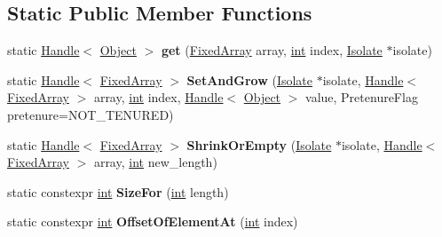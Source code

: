 \subsection*{Static Public Member Functions}
\begin{DoxyCompactItemize}
\item 
\mbox{\label{classv8_1_1internal_1_1FixedArray_a27192a0f72c7e134bbc173d14f9780d0}} 
static \mbox{\hyperlink{classv8_1_1internal_1_1Handle}{Handle}}$<$ \mbox{\hyperlink{classv8_1_1internal_1_1Object}{Object}} $>$ {\bfseries get} (\mbox{\hyperlink{classv8_1_1internal_1_1FixedArray}{Fixed\+Array}} array, \mbox{\hyperlink{classint}{int}} index, \mbox{\hyperlink{classv8_1_1internal_1_1Isolate}{Isolate}} $\ast$isolate)
\item 
\mbox{\label{classv8_1_1internal_1_1FixedArray_a43874f8238723bf8cd4a1ef8a71425fb}} 
static \mbox{\hyperlink{classv8_1_1internal_1_1Handle}{Handle}}$<$ \mbox{\hyperlink{classv8_1_1internal_1_1FixedArray}{Fixed\+Array}} $>$ {\bfseries Set\+And\+Grow} (\mbox{\hyperlink{classv8_1_1internal_1_1Isolate}{Isolate}} $\ast$isolate, \mbox{\hyperlink{classv8_1_1internal_1_1Handle}{Handle}}$<$ \mbox{\hyperlink{classv8_1_1internal_1_1FixedArray}{Fixed\+Array}} $>$ array, \mbox{\hyperlink{classint}{int}} index, \mbox{\hyperlink{classv8_1_1internal_1_1Handle}{Handle}}$<$ \mbox{\hyperlink{classv8_1_1internal_1_1Object}{Object}} $>$ value, Pretenure\+Flag pretenure=N\+O\+T\+\_\+\+T\+E\+N\+U\+R\+ED)
\item 
\mbox{\label{classv8_1_1internal_1_1FixedArray_a7bb28a3dc6e19a72d6f971d8ffadcc52}} 
static \mbox{\hyperlink{classv8_1_1internal_1_1Handle}{Handle}}$<$ \mbox{\hyperlink{classv8_1_1internal_1_1FixedArray}{Fixed\+Array}} $>$ {\bfseries Shrink\+Or\+Empty} (\mbox{\hyperlink{classv8_1_1internal_1_1Isolate}{Isolate}} $\ast$isolate, \mbox{\hyperlink{classv8_1_1internal_1_1Handle}{Handle}}$<$ \mbox{\hyperlink{classv8_1_1internal_1_1FixedArray}{Fixed\+Array}} $>$ array, \mbox{\hyperlink{classint}{int}} new\+\_\+length)
\item 
\mbox{\label{classv8_1_1internal_1_1FixedArray_a83ccb579a69646f8fa7f3ef7417db455}} 
static constexpr \mbox{\hyperlink{classint}{int}} {\bfseries Size\+For} (\mbox{\hyperlink{classint}{int}} length)
\item 
\mbox{\label{classv8_1_1internal_1_1FixedArray_a3a6001809d6b77cbe399a9ed363ab210}} 
static constexpr \mbox{\hyperlink{classint}{int}} {\bfseries Offset\+Of\+Element\+At} (\mbox{\hyperlink{classint}{int}} index)
\end{DoxyCompactItemize}
